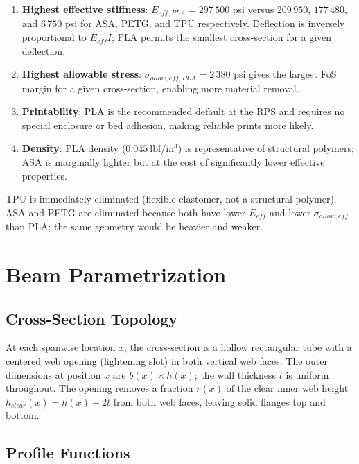 \documentclass[11pt,letterpaper]{article}
\begin{document}
\begin{enumerate}[noitemsep]
  \item \textbf{Highest effective stiffness}: $E_{eff,PLA} = 297\,500$ psi
    versus $209\,950$, $177\,480$, and $6\,750$ psi for ASA, PETG, and TPU
    respectively.  Deflection is inversely proportional to $E_{eff}I$;
    PLA permits the smallest cross-section for a given deflection.
  \item \textbf{Highest allowable stress}: $\sigma_{allow,eff,PLA} = 2\,380$
    psi gives the largest FoS margin for a given cross-section, enabling
    more material removal.
  \item \textbf{Printability}: PLA is the recommended default at the RPS and
    requires no special enclosure or bed adhesion, making reliable prints
    more likely.
  \item \textbf{Density}: PLA density ($0.045\ \mathrm{lbf/in^3}$) is
    representative of structural polymers; ASA is marginally lighter but
    at the cost of significantly lower effective properties.
\end{enumerate}

TPU is immediately eliminated (flexible elastomer, not a structural polymer).
ASA and PETG are eliminated because both have lower $E_{eff}$ and lower
$\sigma_{allow,eff}$ than PLA; the same geometry would be heavier and weaker.


\section{Beam Parametrization}
\label{sec:parametrization}

\subsection{Cross-Section Topology}

At each spanwise location $x$, the cross-section is a hollow rectangular tube
with a centered web opening (lightening slot) in both vertical web faces.
The outer dimensions at position $x$ are $b(x) \times h(x)$; the wall
thickness $t$ is uniform throughout.  The opening removes a fraction $r(x)$
of the clear inner web height $h_{clear}(x) = h(x) - 2t$ from both web faces,
leaving solid flanges top and bottom.

\subsection{Profile Functions}
\end{document}
